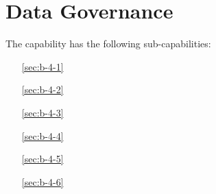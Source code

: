 \chapter{Data Governance}\label{sec:ekgmm-b-4} %

The \currentname capability has the following sub-capabilities:

\begin{itemize}[leftmargin=.5in]
  \item [\ref{sec:b-4-1}] 
  \item [\ref{sec:b-4-2}] 
  \item [\ref{sec:b-4-3}] 
  \item [\ref{sec:b-4-4}] 
  \item [\ref{sec:b-4-5}] 
  \item [\ref{sec:b-4-6}] 
\end{itemize}







